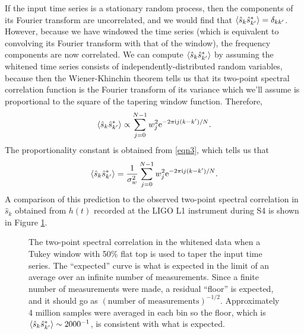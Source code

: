 \documentclass{article}
\begin{document}
If the input time series is a stationary random process, then the
components of its Fourier transform are uncorrelated, and we would find
that \(\left\langle\hat{s}_{k} \hat{s}^{*}_{k'}\right\rangle = \delta_{k k'}\).  However,
because we have windowed the time series (which is equivalent to convolving
its Fourier transform with that of the window), the frequency components
are now correlated.  We can compute \(\left\langle\hat{s}_{k}
\hat{s}^{*}_{k'}\right\rangle\) by assuming the whitened time series consists of
independently-distributed random variables, because then the
Wiener-Khinchin theorem tells us that its two-point spectral correlation
function is the Fourier transform of its variance which we'll assume is
proportional to the square of the tapering window function.  Therefore,
\begin{equation}
\left\langle\hat{s}_{k} \hat{s}^{*}_{k'}\right\rangle
   \propto \sum_{j = 0}^{N - 1} w_{j}^{2} \mathrm{e}^{-2 \pi \mathrm{i} j (k - k') / N}.
\end{equation}
The proportionality constant is obtained from \eqref{eqn3}, which tells us
that
\begin{equation}
\label{eqn4}
\left\langle\hat{s}_{k} \hat{s}^{*}_{k'}\right\rangle
   = \frac{1}{\sigma_{w}^{2}} \sum_{j = 0}^{N - 1} w_{j}^{2} \mathrm{e}^{-2 \pi
   \mathrm{i} j (k - k') / N}.
\end{equation}
A comparison of this prediction to the observed two-point spectral
correlation in \(\hat{s}_{k}\) obtained from \(h(t)\) recorded at the LIGO
L1 instrument during S4 is shown in Figure \ref{fig:sksk}.
\begin{figure}
\begin{center}
\end{center}
\caption{The two-point spectral correlation in the whitened data when a
Tukey window with 50\% flat top is used to taper the input time series.
The ``expected'' curve is what is expected in the limit of an average over
an infinite number of measurements.  Since a finite number of measurements
were made, a residual ``floor'' is expected, and it should go as
\((\text{number of measurements})^{-1/2}\).  Approximately 4 million
samples were averaged in each bin so the floor, which is
\(\left\langle\hat{s}_{k} \hat{s}^{*}_{k'}\right\rangle \sim 2000^{-1}\), is consistent
with what is expected.}
\label{fig:sksk}
\end{figure}
\end{document}
